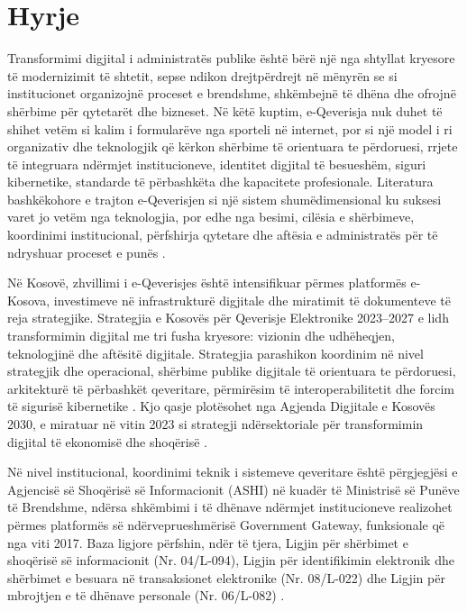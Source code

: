 \documentclass[conference]{IEEEtran}
\begin{document}
\section{Hyrje}
Transformimi digjital i administratës publike është bërë një nga shtyllat kryesore të modernizimit të shtetit, sepse ndikon drejtpërdrejt në mënyrën se si institucionet organizojnë proceset e brendshme, shkëmbejnë të dhëna dhe ofrojnë shërbime për qytetarët dhe bizneset. Në këtë kuptim, e-Qeverisja nuk duhet të shihet vetëm si kalim i formularëve nga sporteli në internet, por si një model i ri organizativ dhe teknologjik që kërkon shërbime të orientuara te përdoruesi, rrjete të integruara ndërmjet institucioneve, identitet digjital të besueshëm, siguri kibernetike, standarde të përbashkëta dhe kapacitete profesionale. Literatura bashkëkohore e trajton e-Qeverisjen si një sistem shumëdimensional ku suksesi varet jo vetëm nga teknologjia, por edhe nga besimi, cilësia e shërbimeve, koordinimi institucional, përfshirja qytetare dhe aftësia e administratës për të ndryshuar proceset e punës \cite{r1,r2,r3}.

Në Kosovë, zhvillimi i e-Qeverisjes është intensifikuar përmes platformës e-Kosova, investimeve në infrastrukturë digjitale dhe miratimit të dokumenteve të reja strategjike. Strategjia e Kosovës për Qeverisje Elektronike 2023–2027 e lidh transformimin digjital me tri fusha kryesore: vizionin dhe udhëheqjen, teknologjinë dhe aftësitë digjitale. Strategjia parashikon koordinim në nivel strategjik dhe operacional, shërbime publike digjitale të orientuara te përdoruesi, arkitekturë të përbashkët qeveritare, përmirësim të interoperabilitetit dhe forcim të sigurisë kibernetike \cite{r4}. Kjo qasje plotësohet nga Agjenda Digjitale e Kosovës 2030, e miratuar në vitin 2023 si strategji ndërsektoriale për transformimin digjital të ekonomisë dhe shoqërisë \cite{r5}.

Në nivel institucional, koordinimi teknik i sistemeve qeveritare është përgjegjësi e Agjencisë së Shoqërisë së Informacionit (ASHI) në kuadër të Ministrisë së Punëve të Brendshme, ndërsa shkëmbimi i të dhënave ndërmjet institucioneve realizohet përmes platformës së ndërveprueshmërisë Government Gateway, funksionale që nga viti 2017. Baza ligjore përfshin, ndër të tjera, Ligjin për shërbimet e shoqërisë së informacionit (Nr. 04/L-094), Ligjin për identifikimin elektronik dhe shërbimet e besuara në transaksionet elektronike (Nr. 08/L-022) dhe Ligjin për mbrojtjen e të dhënave personale (Nr. 06/L-082) \cite{r4}.
\end{document}
